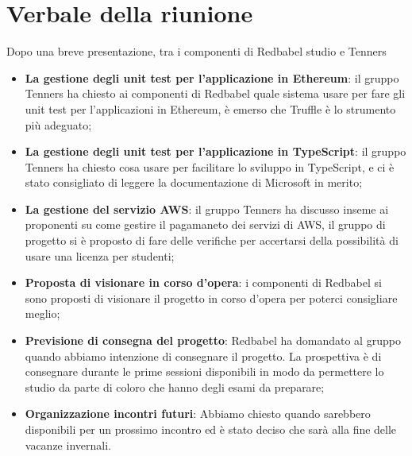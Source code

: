 \section{Verbale della riunione}
		Dopo una breve presentazione, tra i componenti di Redbabel studio e Tenners
	\begin{itemize}
		\item \textbf {La gestione degli unit test per l'applicazione in Ethereum}:
		il gruppo Tenners ha chiesto ai componenti di Redbabel quale sistema usare
		per fare gli unit test per l'applicazioni in Ethereum, è emerso che Truffle
		è lo strumento più adeguato;
		\item \textbf {La gestione degli unit test per l'applicazione in TypeScript}:
		il gruppo Tenners ha chiesto cosa usare per facilitare lo sviluppo in TypeScript,
		e ci è stato consigliato di leggere la documentazione di Microsoft in merito;
		\item \textbf {La gestione del servizio AWS}: il gruppo Tenners ha  discusso
		inseme ai proponenti su come gestire il pagamaneto dei servizi di AWS,
		il gruppo di progetto si è proposto di fare delle verifiche per accertarsi della
		 possibilità di usare una licenza per studenti;
		\item \textbf {Proposta di visionare in corso d'opera}: i componenti di Redbabel
		si sono proposti di visionare il progetto in corso d'opera per poterci consigliare meglio;
		\item \textbf {Previsione di consegna del progetto}: Redbabel ha domandato al gruppo
		quando abbiamo intenzione di consegnare il progetto. La prospettiva è di consegnare durante le prime sessioni disponibili in modo da permettere lo studio da parte di coloro che hanno degli esami da preparare;
		\item \textbf {Organizzazione incontri futuri}: Abbiamo chiesto quando
		sarebbero disponibili per un prossimo incontro ed è stato deciso che sarà
		alla fine delle vacanze invernali.
	\end{itemize}
